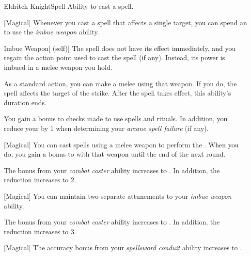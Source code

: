     \begin{feat}{Eldritch Knight}{Spell}
        \featpre Ability to cast a spell.

        [Magical] Whenever you cast a spell that affects a single target, you can spend an  to use the \textit{imbue weapon} ability.
        \begin{ability}{Imbue Weapon}[ (self)]
            The spell does not have its effect immediately, and you regain the action point used to cast the spell (if any).
            Instead, its power is imbued in a melee weapon you hold. 

            As a standard action, you can make a melee  using that weapon.
            If you do, the spell affects the target of the strike.
            After the spell takes effect, this ability's duration ends.
        \end{ability}

         You gain a  bonus to  checks made to use spells and rituals.
        In addition, you reduce your  by 1 when determining your \textit{arcane spell failure} (if any).

        [Magical] You can cast spells using a melee weapon to perform the .
        When you do, you gain a  bonus to  with that weapon until the end of the next round.

         The  bonus from your \textit{combat caster} ability increases to .
        In addition, the  reduction increases to 2.

        [Magical] You can maintain two separate attunements to your \textit{imbue weapon} ability.

         The  bonus from your \textit{combat caster} ability increases to .
        In addition, the  reduction increases to 3.

        [Magical] The accuracy bonus from your \textit{spellsword conduit} ability increases to .
    \end{feat}

